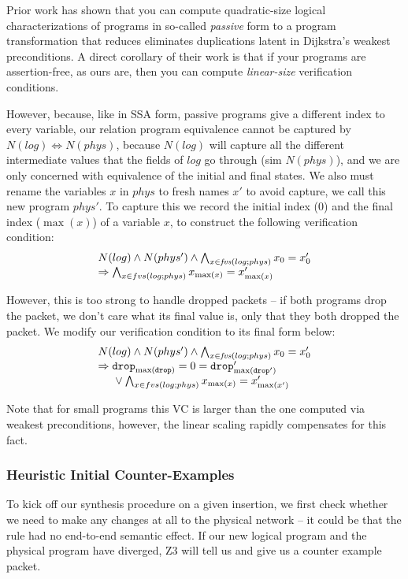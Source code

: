 Prior work has shown that you can compute quadratic-size logical
characterizations of programs in so-called \emph{passive} form to a
program transformation that reduces eliminates duplications latent in
Dijkstra's weakest preconditions. A direct corollary of their work is
that if your programs are assertion-free, as ours are, then you can
compute \emph{linear-size} verification conditions.

However, because, like in SSA form, passive programs give a different
index to every variable, our relation program equivalence cannot be
captured by $N(log) \Leftrightarrow N(phys)$, because $N(log)$ will
capture all the different intermediate values that the fields of $log$
go through (sim $N(phys)$), and we are only concerned with equivalence
of the initial and final states. We also must rename the variables $x$
in $phys$ to fresh names $x'$ to avoid capture, we call this new
program $phys'$. To capture this we record the initial index ($0$) and
the final index ($\max(x)$) of a variable $x$, to construct the
following verification condition:
\[\begin{array}{l}
    N(log) \wedge N(phys') \wedge \bigwedge_{x \in \mathop{{\mathit{fvs}}}(log;phys)} x_0 = x'_0 \\
    \Rightarrow \bigwedge_{x \in fvs(log;phys)} x_{\max(x)} = x'_{\max(x)}
  \end{array}
\]

However, this is too strong to handle dropped packets -- if both
programs drop the packet, we don't care what its final value is, only
that they both dropped the packet. We modify our verification
condition to its final form below:
\[ \begin{array}{l}
     N(log) \wedge N(phys') \wedge \bigwedge_{x \in \mathop{{\mathit{fvs}}}(log;phys)} x_0 = x'_0  \\
     \Rightarrow \texttt{drop}_{\max(\texttt{drop})} = 0 = \texttt{drop}'_{\max(\texttt{drop}')}\\
     \phantom{\Rightarrow}~\vee  \bigwedge_{x \in fvs(log;phys)} x_{\max(x)} = x'_{\max(x')}
   \end{array}
 \]

Note that for small programs this VC is larger than the one computed
via weakest preconditions, however, the linear scaling rapidly
compensates for this fact.

\subsubsection{Heuristic Initial Counter-Examples}
To kick off our synthesis procedure on a given insertion, we first
check whether we need to make any changes at all to the physical
network -- it could be that the rule had no end-to-end semantic
effect. If our new logical program and the physical program have
diverged, Z3 will tell us and give us a counter example packet.

